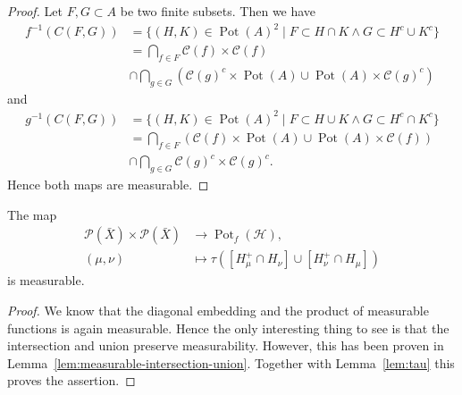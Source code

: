 \begin{proof}
  \label{lem:measurable-intersection-union}
  Let \(F, G \subset A\) be two finite subsets. Then we have
  \begin{align*}
    f^{-1}(C(F,G))
    & = \{(H,K) \in \operatorname{Pot}(A)^2 \mid F \subset H \cap K \wedge G \subset H^c \cup K^c\} \\
    & = \bigcap_{f \in F} \mathcal{C}(f) \times \mathcal{C}(f)\\
    & \cap \bigcap_{g \in G} (\mathcal{C}(g)^c \times \operatorname{Pot}(A) \cup \operatorname{Pot}(A) \times \mathcal{C}(g)^c)
  \end{align*}
  and
  \begin{align*}
    g^{-1}(C(F,G))
    & = \{(H,K) \in \operatorname{Pot}(A)^2 \mid F \subset H \cup K \wedge G \subset H^c \cap K^c\} \\
    & = \bigcap_{f \in F} (\mathcal{C}(f) \times \operatorname{Pot}(A) \cup \operatorname{Pot}(A) \times\mathcal{C}(f))\\
    & \cap \bigcap_{g \in G} \mathcal{C}(g)^c \times \mathcal{C}(g)^c.
  \end{align*}
  Hence both maps are measurable.
\end{proof}

\begin{lemma}
  \label{lem:measurable-tau-int}
  The map
  \begin{align*}
    \mathcal{P}(\bar X) \times \mathcal{P}(\bar X) &\to \operatorname{Pot}_f(\mathcal{H}),\\
    (\mu,\nu) &\mapsto \tau([H_\mu^+ \cap H_\nu] \cup [H_\nu^+ \cap H_\mu])
  \end{align*}
  is measurable.
\end{lemma}

\begin{proof}
  We know that the diagonal embedding and the product of measurable functions is again measurable. Hence the only interesting thing to see is that the intersection and union preserve measurability. However, this has been proven in Lemma~\ref{lem:measurable-intersection-union}. Together with Lemma~\ref{lem:tau} this proves the assertion.
\end{proof}


